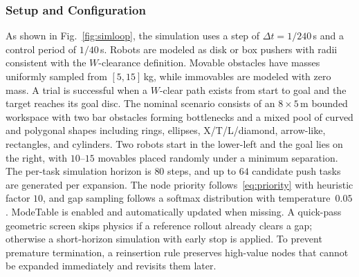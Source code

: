 \subsubsection{Setup and Configuration}\label{subsec:sim-setup}
As shown in Fig.~\ref{fig:simloop}, the simulation uses a step of $\Delta t=1/240$\,s 
and a control period of $1/40$\,s. 
Robots are modeled as disk or box pushers with radii consistent with the $W$-clearance definition. 
Movable obstacles have masses uniformly sampled from $[5,15]$\,kg, 
while immovables are modeled with zero mass. 
A trial is successful when a $W$-clear path exists from start to goal and the target reaches
its goal disc. The nominal scenario consists of an $8{\times}5$\,m bounded workspace with two bar
obstacles forming bottlenecks and a mixed pool of curved and polygonal shapes including rings,
ellipses, X/T/L/diamond, arrow-like, rectangles, and cylinders. Two robots start in the lower-left
and the goal lies on the right, with $10$--$15$ movables placed randomly under a minimum separation.
The per-task simulation horizon is $80$ steps, and up to $64$ candidate push tasks are generated per
expansion. The node priority follows~\eqref{eq:priority} with heuristic factor
$10$, and gap sampling follows a softmax distribution with temperature~$0.05$. 
ModeTable is enabled and automatically updated when missing. 
A quick-pass geometric screen skips physics if a reference
rollout already clears a gap; otherwise a short-horizon simulation with early stop is applied. 
To prevent premature termination, a reinsertion rule preserves high-value nodes that cannot be
expanded immediately and revisits them later.

